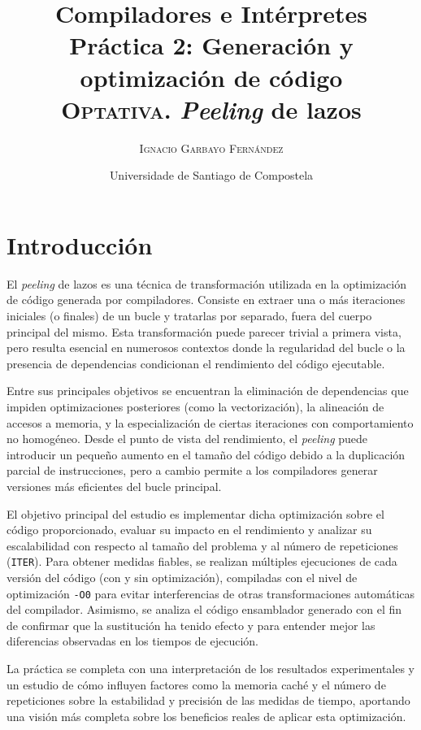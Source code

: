 \documentclass[11pt,a4paper,twoside]{article}
\title{%
	\LARGE \textbf{Compiladores e Intérpretes} \\ \vspace*{1cm} \textbf{Práctica 2: Generación y optimización de código}
	\\ \Large \textbf{\textsc{Optativa}. \textit{Peeling} de lazos}}
\author{\textsc{Ignacio Garbayo Fernández}}
\date{Universidade de Santiago de Compostela}
\theoremstyle{definition}
\begin{document}
	
	\maketitle
	\thispagestyle{empty}
	
	\vspace*{1cm}
	
	\renewcommand{\contentsname}{Índice} %
	\tableofcontents


	\newpage


	\section{Introducción}
	
	El \textit{peeling} de lazos es una técnica de transformación utilizada en la optimización de código generada por compiladores. Consiste en extraer una o más iteraciones iniciales (o finales) de un bucle y tratarlas por separado, fuera del cuerpo principal del mismo. Esta transformación puede parecer trivial a primera vista, pero resulta esencial en numerosos contextos donde la regularidad del bucle o la presencia de dependencias condicionan el rendimiento del código ejecutable.
	
	Entre sus principales objetivos se encuentran la eliminación de dependencias que impiden optimizaciones posteriores (como la vectorización), la alineación de accesos a memoria, y la especialización de ciertas iteraciones con comportamiento no homogéneo. Desde el punto de vista del rendimiento, el \textit{peeling} puede introducir un pequeño aumento en el tamaño del código debido a la duplicación parcial de instrucciones, pero a cambio permite a los compiladores generar versiones más eficientes del bucle principal.
	
	El objetivo principal del estudio es implementar dicha optimización sobre el código proporcionado, evaluar su impacto en el rendimiento y analizar su escalabilidad con respecto al tamaño del problema y al número de repeticiones (\texttt{ITER}). Para obtener medidas fiables, se realizan múltiples ejecuciones de cada versión del código (con y sin optimización), compiladas con el nivel de optimización \texttt{-O0} para evitar interferencias de otras transformaciones automáticas del compilador. Asimismo, se analiza el código ensamblador generado con el fin de confirmar que la sustitución ha tenido efecto y para entender mejor las diferencias observadas en los tiempos de ejecución.
	
	La práctica se completa con una interpretación de los resultados experimentales y un estudio de cómo influyen factores como la memoria caché y el número de repeticiones sobre la estabilidad y precisión de las medidas de tiempo, aportando una visión más completa sobre los beneficios reales de aplicar esta optimización.
	
\end{document}
